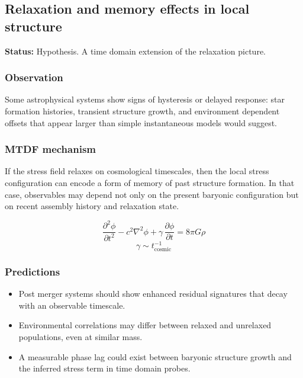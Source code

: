 \documentclass[11pt,a4paper]{article}
\begin{document}
\subsection{Relaxation and memory effects in local structure}
\begin{mdframed}[linecolor=accent,linewidth=0.5pt,backgroundcolor=callout-bg,leftline=true,rightline=true,topline=true,bottomline=true,innerleftmargin=8pt,innerrightmargin=8pt,innertopmargin=6pt,innerbottommargin=6pt]
\textbf{Status:} Hypothesis. A time domain extension of the relaxation picture.
\end{mdframed}

\subsubsection{Observation}
Some astrophysical systems show signs of hysteresis or delayed response: star formation histories, transient structure growth, and environment dependent offsets that appear larger than simple instantaneous models would suggest.

\subsubsection{MTDF mechanism}
If the stress field relaxes on cosmological timescales, then the local stress configuration can encode a form of memory of past structure formation. In that case, observables may depend not only on the present baryonic configuration but on recent assembly history and relaxation state.

$$
\frac{\partial^2 \phi}{\partial t^2} - c^2\nabla^2\phi + \gamma\,\frac{\partial \phi}{\partial t} = 8\pi G\rho
$$
$$
\gamma \sim t_{\mathrm{cosmic}}^{-1}
$$

\subsubsection{Predictions}
\begin{itemize}
  \item Post merger systems should show enhanced residual signatures that decay with an observable timescale.
  \item Environmental correlations may differ between relaxed and unrelaxed populations, even at similar mass.
  \item A measurable phase lag could exist between baryonic structure growth and the inferred stress term in time domain probes.
\end{itemize}
\end{document}
